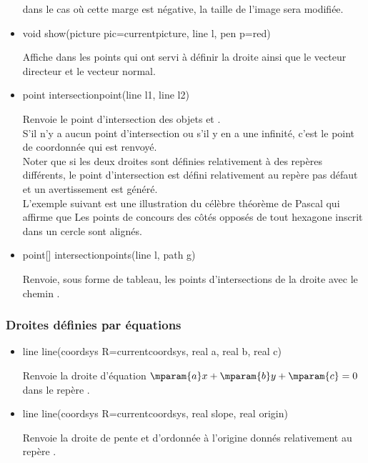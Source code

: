 \documentclass[pdftex]{article}
\begin{document}
\begin{itemize}
  dans le cas où cette marge est négative, la taille de l'image sera
  modifiée.
\item {}%
    \begin{Vcolor}
    void show(picture pic=currentpicture, line l, pen p=red)
  \end{Vcolor}
  Affiche dans  les points qui ont servi à définir la
  droite  ainsi que le vecteur directeur et le vecteur
  normal.
\item {}%
    \begin{Vcolor}
    point intersectionpoint(line l1, line l2)
  \end{Vcolor}
  Renvoie le point d'intersection des objets 
  et .\\
  S'il n'y a aucun point d'intersection ou s'il y en a une infinité,
  c'est le point de coordonnée\linebreak{} qui est
  renvoyé.\\
  Noter que si les deux droites sont définies relativement à des
  repères différents, le point d'intersection est défini relativement
  au repère pas défaut  et un
  avertissement est généré.\\
  L'exemple suivant est une illustration du célèbre théorème de
  {\sc Pascal} qui affirme que \og{}Les points de concours des côtés
  opposés de tout hexagone inscrit dans un cercle sont alignés.\fg{}
\item {}%
    \begin{Vcolor}
    point[] intersectionpoints(line l, path g)
  \end{Vcolor}
  Renvoie, sous forme de tableau, les points d'intersections de la
  \og{}droite\fg{}  avec le chemin .
\end{itemize}

\subsubsection{Droites définies par équations}
\begin{itemize}
\item {}%
    \begin{Vcolor}
    line line(coordsys R=currentcoordsys, real a, real b, real c)
  \end{Vcolor}
  Renvoie la droite d'équation $\mparam{a}x+\mparam{b}y+\mparam{c}=0$
  dans le repère .
\item {}%
    \begin{Vcolor}
    line line(coordsys R=currentcoordsys, real slope, real origin)
  \end{Vcolor}
  Renvoie la droite de pente  et d'ordonnée à
  l'origine  donnés relativement au repère .
\end{itemize}
\end{document}
